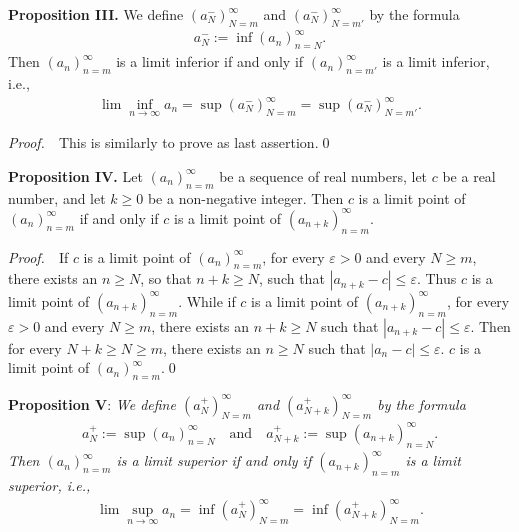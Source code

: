 \documentclass{book}
\newcommand{\pff}{\vspace{.25em}\noindent\emph{Proof.}~~}
\newcommand{\titl}[1]{\noindent\textbf{#1}}
\begin{document}
\begin{framed}
\titl{Proposition I\!I\!I.} We define $(a_N^-)_{N=m}^\infty$ and $(a_N^-)_{N=m'}^\infty$ by the formula
    \begin{align*}
        a_N^-:=\inf(a_n)_{n=N}^\infty.
    \end{align*}
Then $(a_n)_{n=m}^\infty$ is a limit inferior if and only if $(a_n)_{n=m'}^\infty$ is a limit inferior, i.e.,
    \begin{align*}
        \lim\inf_{n\to\infty}a_n=\sup(a_N^-)_{N=m}^\infty=\sup(a_N^-)_{N=m'}^\infty.
    \end{align*}
\end{framed}

\pff This is similarly to prove as last assertion.\qed

\begin{framed}
\titl{Proposition I\!V.} Let $(a_n)_{n=m}^\infty$ be a sequence of real numbers, let $c$ be a real number, and let $k\geq 0$ be a non-negative integer. Then $c$ is a limit point of $(a_n)_{n=m}^\infty$ if and only if $c$ is a limit point of $(a_{n+k})_{n=m}^\infty$.
\end{framed}

\pff If $c$ is a limit point of $(a_n)_{n=m}^\infty$, for every $\varepsilon>0$ and every $N\geq m$, there exists an $n\geq N$, so that $n+k\geq N$, such that $|a_{n+k}-c|\leq\varepsilon$. Thus $c$ is a limit point of $(a_{n+k})_{n=m}^\infty$. While if $c$ is a limit point of $(a_{n+k})_{n=m}^\infty$, for every $\varepsilon>0$ and every $N\geq m$, there exists an $n+k\geq N$ such that $|a_{n+k}-c|\leq\varepsilon$. Then for every $N+k\geq N\geq m$, there exists an $n\geq N$ such that $|a_n-c|\leq\varepsilon$. $c$ is a limit point of $(a_n)_{n=m}^\infty$.\qed

\begin{framed}
\titl{Proposition V}: \emph{We define $(a_N^+)_{N=m}^\infty$ and $(a_{N+k}^+)_{N=m}^\infty$ by the formula}
    \begin{align*}
        a_N^+:=\sup(a_n)_{n=N}^\infty\quad\text{and}\quad a_{N+k}^+:=\sup(a_{n+k})_{n=N}^\infty.
    \end{align*}
\emph{Then $(a_n)_{n=m}^\infty$ is a limit superior if and only if $(a_{n+k})_{n=m}^\infty$ is a limit superior, i.e.,}
    \begin{align*}
        \lim\sup_{n\to\infty}a_n=\inf(a_N^+)_{N=m}^\infty=\inf(a_{N+k}^+)_{N=m}^\infty.
    \end{align*}
\end{framed}
\end{document}
